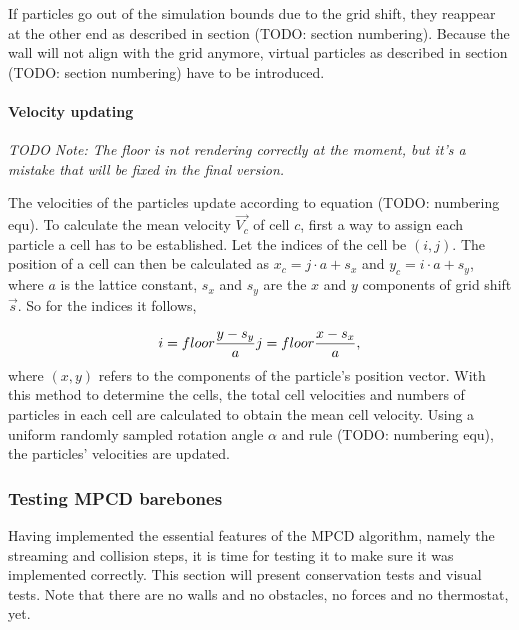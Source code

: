 \documentclass[
]{article}
\begin{document}
If particles go out of the simulation bounds due to the grid shift, they
reappear at the other end as described in section (TODO: section
numbering). Because the wall will not align with the grid anymore,
virtual particles as described in section (TODO: section numbering) have
to be introduced.

\hypertarget{velocity-updating}{%
\paragraph{Velocity updating}\label{velocity-updating}}

\emph{TODO} \emph{Note: The floor is not rendering correctly at the
moment, but it's a mistake that will be fixed in the final version.}

The velocities of the particles update according to equation (TODO:
numbering equ). To calculate the mean velocity \(\vec{V_{c}}\) of cell
\(c\), first a way to assign each particle a cell has to be established.
Let the indices of the cell be \((i, j)\). The position of a cell can
then be calculated as \(x_c = j \cdot a + s_x\) and
\(y_c = i \cdot a + s_y\), where \(a\) is the lattice constant, \(s_x\)
and \(s_y\) are the \(x\) and \(y\) components of grid shift
\(\vec{s}\). So for the indices it follows,

\begin{equation}
i = floor{\frac{y - s_y}{a}}\\
j = floor{\frac{x - s_x}{a}},
\end{equation} where \((x,y)\) refers to the components of the
particle's position vector. With this method to determine the cells, the
total cell velocities and numbers of particles in each cell are
calculated to obtain the mean cell velocity. Using a uniform randomly
sampled rotation angle \(\alpha\) and rule (TODO: numbering equ), the
particles' velocities are updated.

\hypertarget{testing-mpcd-barebones}{%
\subsubsection{Testing MPCD barebones}\label{testing-mpcd-barebones}}

Having implemented the essential features of the MPCD algorithm, namely
the streaming and collision steps, it is time for testing it to make
sure it was implemented correctly. This section will present
conservation tests and visual tests. Note that there are no walls and no
obstacles, no forces and no thermostat, yet.
\end{document}
